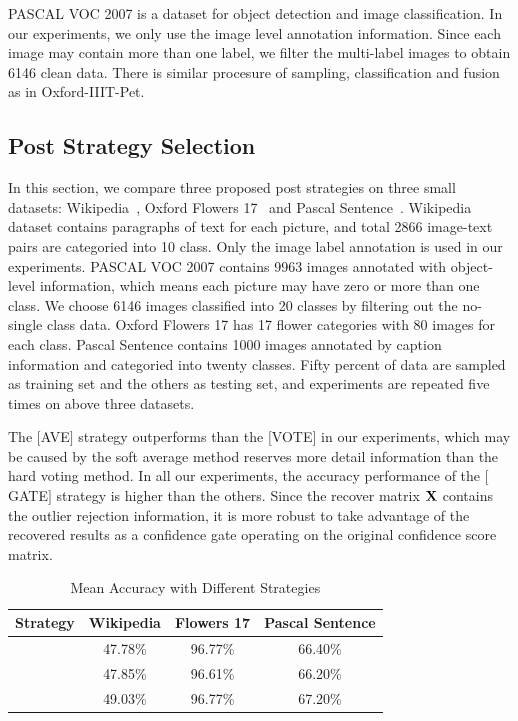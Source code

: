 \documentclass[letterpaper]{article}
\def\bX{{\bf X}}
\def\bX{{\bf X}}
\begin{document}
PASCAL VOC 2007 is a dataset for object detection and image classification.
In our experiments, we only use the image level annotation information.
Since each image may contain more than one label, we filter the multi-label images to obtain 6146 clean data.
There is similar procesure of sampling, classification and fusion as in Oxford-IIIT-Pet.



\subsection{Post Strategy Selection}

In this section, we compare three proposed post strategies on three small datasets: Wikipedia~\cite{rasiwasia2010new}, Oxford Flowers 17~\cite{nilsback2006visual} and Pascal Sentence~\cite{Li2006One}.
Wikipedia dataset contains paragraphs of text for each picture, and total 2866 image-text pairs are categoried into 10 class.
Only the image label annotation is used in our experiments.
PASCAL VOC 2007 contains 9963 images annotated with object-level information, which means each picture may have zero or more than one class.
We choose 6146 images classified into 20 classes by filtering out the no-single class data.
Oxford Flowers 17 has 17 flower categories with 80 images for each class.
Pascal Sentence contains 1000 images annotated by caption information and categoried into twenty classes.
Fifty percent of data are sampled as training set and the others as testing set, and experiments are repeated five times on above three datasets.

The $[$AVE$]$ strategy outperforms than the $[$VOTE$]$ in our experiments, which may be caused by the soft average method reserves more detail information than the hard voting method.
In all our experiments, the accuracy performance of the $[$GATE$]$ strategy is higher than the others.
Since the recover matrix $\bX$ contains the outlier rejection information,
it is more robust to take advantage of the recovered results as a confidence gate operating on the original confidence score matrix.

\begin{table}[h]
\small
\centering
\caption{Mean Accuracy with Different Strategies}
\begin{tabular}{c|c|c|c}
\hline
Strategy            & Wikipedia & Flowers 17 & Pascal Sentence \\\hline
[AVE]               & 47.78\%   & 96.77\%    &   66.40\%       \\\hline
[VOTE]              & 47.85\%   & 96.61\%    &   66.20\%       \\\hline
[GATE]              & 49.03\%   & 96.77\%    &   67.20\%       \\
\hline
\end{tabular}
\label{table:strategy}
\end{table}
\end{document}
